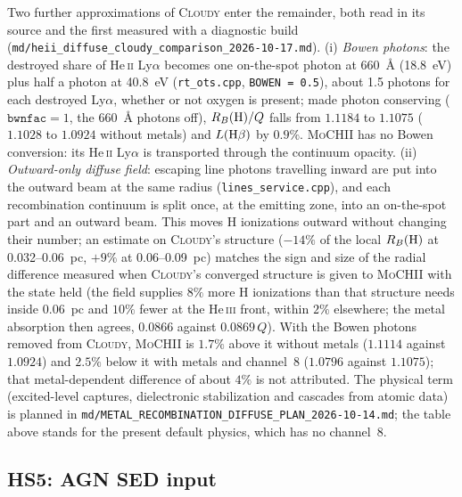 \documentclass[english,a4paper]{my_memo}
\newcommand{\code}[1]{\texttt{#1}}
\newcommand{\MoCHII}{\textsc{MoCHII}}
\newcommand{\Cloudy}{\textsc{Cloudy}}
\begin{document}
Two further approximations of \Cloudy{} enter the remainder, both read in its
source and the first measured with a diagnostic build
(\code{md/heii\_diffuse\_cloudy\_comparison\_2026-10-17.md}).
(i) \emph{Bowen photons}: the destroyed share of He\,\textsc{ii} Ly$\alpha$
becomes one on-the-spot photon at 660~\AA{} (18.8~eV) plus half a photon at
40.8~eV (\code{rt\_ots.cpp}, \code{BOWEN = 0.5}), about 1.5 photons for each
destroyed Ly$\alpha$, whether or not oxygen is present; made photon
conserving ($\code{bwnfac} = 1$, the 660~\AA{} photons off), $R_B({\rm
H})/Q$ falls from $1.1184$ to $1.1075$ ($1.1028$ to $1.0924$ without metals)
and $L({\rm H}\beta)$ by $0.9\%$.  \MoCHII{} has no Bowen conversion: its
He\,\textsc{ii} Ly$\alpha$ is transported through the continuum opacity.
(ii) \emph{Outward-only diffuse field}: escaping line photons travelling
inward are put into the outward beam at the same radius
(\code{lines\_service.cpp}), and each recombination continuum is split once,
at the emitting zone, into an on-the-spot part and an outward beam.  This
moves H ionizations outward without changing their number; an estimate on
\Cloudy{}'s structure ($-14\%$ of the local $R_B({\rm H})$ at 0.032--0.06~pc,
$+9\%$ at 0.06--0.09~pc) matches the sign and size of the radial difference
measured when \Cloudy{}'s converged structure is given to \MoCHII{} with the
state held (the field supplies $8\%$ more H ionizations than that structure
needs inside 0.06~pc and $10\%$ fewer at the He\,\textsc{iii} front,
within $2\%$ elsewhere; the metal absorption then agrees, $0.0866$ against
$0.0869\,Q$).  With the Bowen photons removed from \Cloudy{}, \MoCHII{} is
$1.7\%$ above it without metals ($1.1114$ against $1.0924$) and $2.5\%$
below it with metals and channel~8 ($1.0796$ against $1.1075$); that
metal-dependent difference of about $4\%$ is not attributed.  The physical term (excited-level captures,
dielectronic stabilization and cascades from atomic data) is planned in
\code{md/METAL\_RECOMBINATION\_DIFFUSE\_PLAN\_2026-10-14.md}; the table
above stands for the present default physics, which has no channel~8.


\subsection{HS5: AGN SED input}
\end{document}

